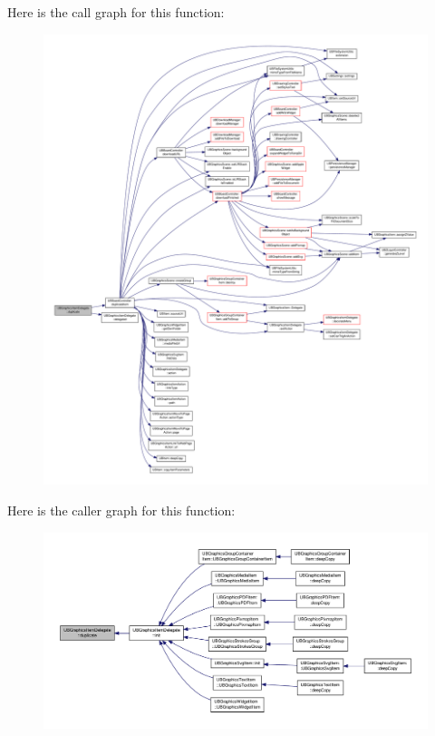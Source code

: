 Here is the call graph for this function\-:
\nopagebreak
\begin{figure}[H]
\begin{center}
\leavevmode
\includegraphics[width=350pt]{dd/dd5/class_u_b_graphics_item_delegate_a525c69cb3c3c0df6c4db4d406fd80e48_cgraph}
\end{center}
\end{figure}




Here is the caller graph for this function\-:
\nopagebreak
\begin{figure}[H]
\begin{center}
\leavevmode
\includegraphics[width=350pt]{dd/dd5/class_u_b_graphics_item_delegate_a525c69cb3c3c0df6c4db4d406fd80e48_icgraph}
\end{center}
\end{figure}


